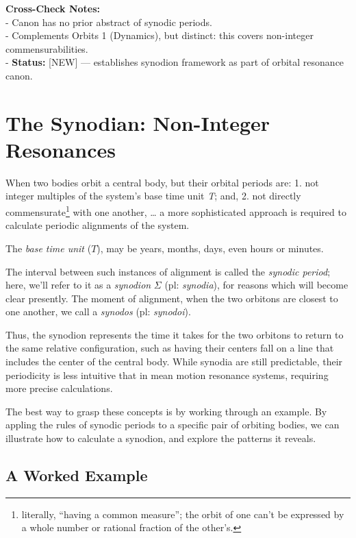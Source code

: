 \documentclass[
  letterpaper,
]{book}
\begin{document}
\textbf{Cross-Check Notes:}\\
- Canon has no prior abstract of synodic periods.\\
- Complements Orbits 1 (Dynamics), but distinct: this covers non-integer
commensurabilities.\\
- \textbf{Status:} {[}NEW{]} --- establishes synodion framework as part
of orbital resonance canon.

\section{The Synodian: Non-Integer
Resonances}\label{the-synodian-non-integer-resonances}

When two bodies orbit a central body, but their orbital periods are: 1.
not integer multiples of the system's base time unit \emph{T}; and, 2.
not directly commensurate\footnote{literally, ``having a common
  measure''; the orbit of one can't be expressed by a whole number or
  rational fraction of the other's.} with one another, \ldots{} a more
sophisticated approach is required to calculate periodic alignments of
the system.

The \emph{base time unit} (\(T\)), may be years, months, days, even
hours or minutes.

The interval between such instances of alignment is called the
\emph{synodic period}; here, we'll refer to it as a \emph{synodion}
\(\Sigma\) (pl: \emph{synodia}), for reasons which will become clear
presently. The moment of alignment, when the two orbitons are closest to
one another, we call a \emph{synodos} (pl: \emph{synodoi}).

Thus, the synodion represents the time it takes for the two orbitons to
return to the same relative configuration, such as having their centers
fall on a line that includes the center of the central body. While
synodia are still predictable, their periodicity is less intuitive that
in mean motion resonance systems, requiring more precise calculations.

The best way to grasp these concepts is by working through an example.
By appling the rules of synodic periods to a specific pair of orbiting
bodies, we can illustrate how to calculate a synodion, and explore the
patterns it reveals.

\subsection{A Worked Example}\label{a-worked-example}
\end{document}
